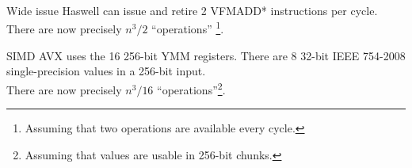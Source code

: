 \documentclass[mathserif,xcolor={dvipsnames,table}]{beamer}
\begin{document}
{
%
\begin{frame}[b]{Wide issue}
\scriptsize{
Haswell can issue and retire 2 VFMADD* instructions per cycle.\\
There are now precisely $n^{3}/2$ ``operations''
\footnote{\tiny{Assuming that two operations are available every cycle.}}.
\vspace{.1in}
}
\end{frame}
}

{
%
\begin{frame}[b]{SIMD}
\scriptsize{
AVX uses the 16 256-bit YMM registers. There are 8 32-bit IEEE 754-2008
single-precision values in a 256-bit input.\\
There are now precisely $n^{3}/16$ ``operations''\footnote{Assuming that values
are usable in 256-bit chunks.}.
\vspace{.1in}
}
\end{frame}
}
\end{document}
